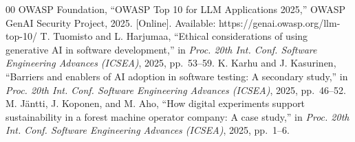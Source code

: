 \begin{thebibliography}{00}
 OWASP Foundation, ``OWASP Top 10 for LLM Applications 2025,'' OWASP GenAI Security Project, 2025. [Online]. Available: https://genai.owasp.org/llm-top-10/
 T. Tuomisto and L. Harjumaa, ``Ethical considerations of using generative AI in software development,'' in \emph{Proc. 20th Int. Conf. Software Engineering Advances (ICSEA)}, 2025, pp.~53--59.
 K. Karhu and J. Kasurinen, ``Barriers and enablers of AI adoption in software testing: A secondary study,'' in \emph{Proc. 20th Int. Conf. Software Engineering Advances (ICSEA)}, 2025, pp.~46--52.
 M. J\"antti, J. Koponen, and M. Aho, ``How digital experiments support sustainability in a forest machine operator company: A case study,'' in \emph{Proc. 20th Int. Conf. Software Engineering Advances (ICSEA)}, 2025, pp.~1--6.
\end{thebibliography}
